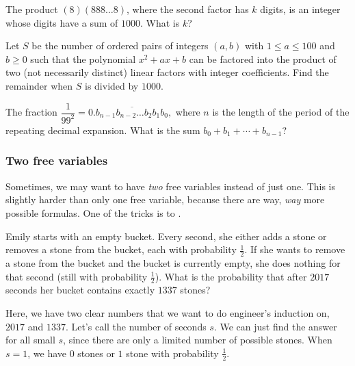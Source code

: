 \documentclass[11pt,paper=letter]{scrartcl}
\begin{document}
\begin{mdframed}[style=exmdbox]

\begin{problem}[AMC 12A 2014/16]
The product $(8)(888\ldots 8)$, where the second factor has $k$ digits, is an integer whose digits have a sum of $1000$. What is $k$?
\end{problem}

\begin{problem}[AIME I 2018/1]
Let $S$ be the number of ordered pairs of integers $(a,b)$ with $1 \leq a \leq 100$ and $b \geq 0$ such that the polynomial $x^2+ax+b$ can be factored into the product of two (not necessarily distinct) linear factors with integer coefficients. Find the remainder when $S$ is divided by $1000$.
\end{problem}

\begin{problem}[AMC 12A 2014/23]
The fraction $\dfrac1{99^2}=0.\overline{b_{n-1}b_{n-2}\ldots b_2b_1b_0},$ where $n$ is the length of the period of the repeating decimal expansion. What is the sum $b_0+b_1+\cdots+b_{n-1}$? \hint{\ref{h:4}}
\end{problem}

\end{mdframed}

\subsubsection{Two free variables}

Sometimes, we may want to have \textit{two} free variables instead of just one. This is slightly harder than only one free variable, because there are way, \textit{way} more possible formulas. One of the tricks is to .

\begin{exboxed}
  Emily starts with an empty bucket. Every second, she either adds a stone or removes a stone from the bucket, each with probability $\frac12$. If she wants to remove a stone from the bucket and the bucket is currently empty, she does nothing for that second (still with probability $\frac12$). What is the probability that after $2017$ seconds her bucket contains exactly $1337$ stones?
\end{exboxed}

Here, we have two clear numbers that we want to do engineer's induction on, $2017$ and $1337$. Let's call the number of seconds $s$. We can just find the answer for all small $s$, since there are only a limited number of possible stones. When $s = 1$, we have $0$ stones or $1$ stone with probability $\frac{1}{2}$.
\end{document}
